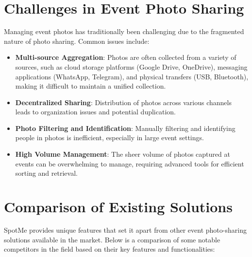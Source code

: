 \documentclass[12pt,a4paper]{report}
\begin{document}
\section{Challenges in Event Photo Sharing}
Managing event photos has traditionally been challenging due to the fragmented nature of photo sharing. Common issues include:
\begin{itemize}
    \item \textbf{Multi-source Aggregation}: Photos are often collected from a variety of sources, such as cloud storage platforms (Google Drive, OneDrive), messaging applications (WhatsApp, Telegram), and physical transfers (USB, Bluetooth), making it difficult to maintain a unified collection.
    \item \textbf{Decentralized Sharing}: Distribution of photos across various channels leads to organization issues and potential duplication.
    \item \textbf{Photo Filtering and Identification}: Manually filtering and identifying people in photos is inefficient, especially in large event settings.
    \item \textbf{High Volume Management}: The sheer volume of photos captured at events can be overwhelming to manage, requiring advanced tools for efficient sorting and retrieval.
\end{itemize}

\section{Comparison of Existing Solutions}
SpotMe provides unique features that set it apart from other event photo-sharing solutions available in the market. Below is a comparison of some notable competitors in the field based on their key features and functionalities:

\begin{table}[htbp]
\caption{Comparison of Event Photo Sharing Platforms}
\vspace{0.5cm}
\label{table:platform-comparison}
\end{table}
\end{document}
